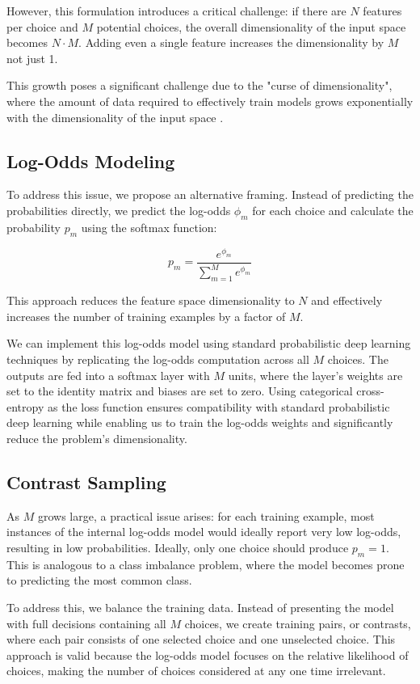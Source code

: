 \documentclass[11pt]{article}
\begin{document}
However, this formulation introduces a critical challenge: if there are $N$ features per choice and $M$ potential choices, the overall dimensionality of the input space becomes $N \cdot M$. Adding even a single feature increases the dimensionality by $M$ not just 1.

This growth poses a significant challenge due to the "curse of dimensionality", where the amount of data required to effectively train models grows exponentially with the dimensionality of the input space \citep{curse}.

\subsection*{Log-Odds Modeling}

To address this issue, we propose an alternative framing. Instead of predicting the probabilities directly, we predict the log-odds $\phi_m$ for each choice and calculate the probability $p_m$ using the softmax function:

$$p_m = \frac{e^{\phi_m}}{\sum_{m=1}^{M}e^{\phi_m}}$$

This approach reduces the feature space dimensionality to $N$ and effectively increases the number of training examples by a factor of $M$.

We can implement this log-odds model using standard probabilistic deep learning techniques by replicating the log-odds computation across all $M$ choices. The outputs are fed into a softmax layer with $M$ units, where the layer's weights are set to the identity matrix and biases are set to zero. Using categorical cross-entropy as the loss function ensures compatibility with standard probabilistic deep learning while enabling us to train the log-odds weights and significantly reduce the problem's dimensionality.

\subsection*{Contrast Sampling}

As $M$ grows large, a practical issue arises: for each training example, most instances of the internal log-odds model would ideally report very low log-odds, resulting in low probabilities. Ideally, only one choice should produce $p_m=1$. This is analogous to a class imbalance problem, where the model becomes prone to predicting the most common class.

To address this, we balance the training data. Instead of presenting the model with full decisions containing all $M$ choices, we create training pairs, or contrasts, where each pair consists of one selected choice and one unselected choice. This approach is valid because the log-odds model focuses on the relative likelihood of choices, making the number of choices considered at any one time irrelevant.
\end{document}
